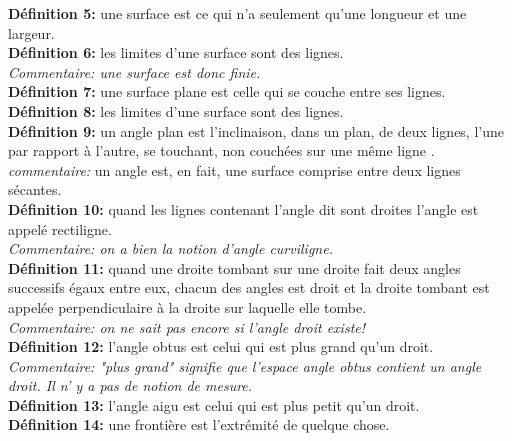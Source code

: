 \documentclass[a4paper, 12pt, twoside]{book}
\begin{document}
\textbf{Définition 5:} une surface est ce qui n'a seulement qu'une longueur et une largeur.\\

\textbf{Définition 6:} les limites d'une surface sont des lignes.\\

\textit{Commentaire: une surface est donc finie.}\\

\textbf{Définition 7:} une surface plane est celle qui se couche entre ses lignes.\\

\textbf{Définition 8:} les limites d'une surface sont des lignes.\\


\textbf{Définition 9:} un angle plan est l'inclinaison, dans un plan, de deux lignes, l'une par rapport à l'autre, se touchant, non couchées sur une même ligne .\\

\textit{commentaire:} un angle est, en fait, une surface comprise entre deux lignes sécantes.\\

\textbf{Définition 10:} quand les lignes contenant l'angle dit sont droites l'angle est appelé rectiligne.\\

\textit{Commentaire: on a bien la notion d'angle curviligne.}\\

\textbf{Définition 11:} quand une droite tombant sur une droite fait deux angles successifs égaux entre eux, chacun des angles est droit et la droite tombant est appelée perpendiculaire à la droite sur laquelle elle tombe.\\

\textit{Commentaire: on ne sait pas encore si l'angle droit existe!}\\

\textbf{Définition 12:} l'angle obtus est celui qui est plus grand qu'un droit.\\

\textit{Commentaire: "plus grand" signifie que l'espace angle obtus contient un angle droit. Il n' y a pas de notion de mesure.}\\

\textbf{Définition 13:} l'angle aigu est celui qui est plus petit qu'un droit.\\

\textbf{Définition 14:} une frontière est l'extrémité de quelque chose.\\
\end{document}
